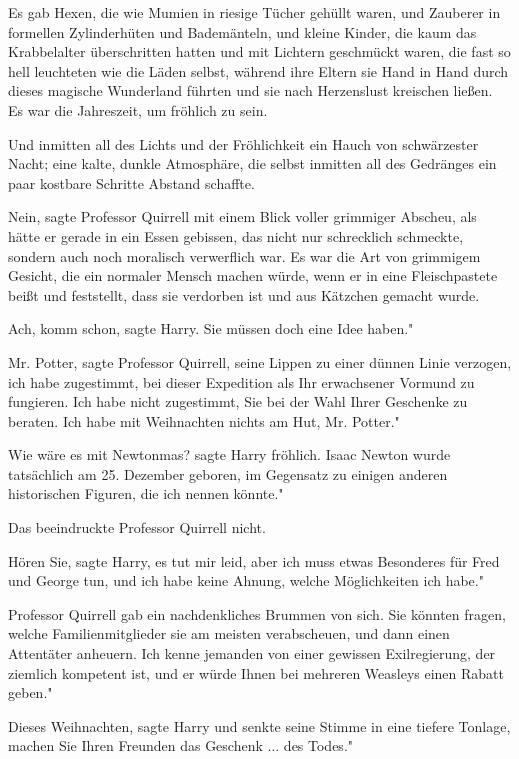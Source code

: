 Es gab Hexen, die wie Mumien in riesige Tücher gehüllt waren, und Zauberer in
formellen Zylinderhüten und Bademänteln, und kleine Kinder, die kaum das
Krabbelalter überschritten hatten und mit Lichtern geschmückt waren, die fast so
hell leuchteten wie die Läden selbst, während ihre Eltern sie Hand in Hand durch
dieses magische Wunderland führten und sie nach Herzenslust kreischen ließen. Es
war die Jahreszeit, um fröhlich zu sein.

Und inmitten all des Lichts und der Fröhlichkeit ein Hauch von schwärzester
Nacht; eine kalte, dunkle Atmosphäre, die selbst inmitten all des Gedränges ein
paar kostbare Schritte Abstand schaffte.

\glqq Nein\grqq{}, sagte Professor Quirrell mit einem Blick voller grimmiger
Abscheu, als hätte er gerade in ein Essen gebissen, das nicht nur schrecklich
schmeckte, sondern auch noch moralisch verwerflich war. Es war die Art von
grimmigem Gesicht, die ein normaler Mensch machen würde, wenn er in eine
Fleischpastete beißt und feststellt, dass sie verdorben ist und aus Kätzchen
gemacht wurde.

\glqq Ach, komm schon\grqq{}, sagte Harry. \glqq Sie müssen doch eine Idee
haben."

\glqq Mr. Potter\grqq{}, sagte Professor Quirrell, seine Lippen zu einer dünnen
Linie verzogen, \glqq ich habe zugestimmt, bei dieser Expedition als Ihr
erwachsener Vormund zu fungieren. Ich habe nicht zugestimmt, Sie bei der Wahl
Ihrer Geschenke zu beraten. Ich habe mit Weihnachten nichts am Hut, Mr. Potter."

\glqq Wie wäre es mit Newtonmas?\grqq{} sagte Harry fröhlich. \glqq Isaac Newton
wurde tatsächlich am 25. Dezember geboren, im Gegensatz zu einigen anderen
historischen Figuren, die ich nennen könnte."

Das beeindruckte Professor Quirrell nicht.

\glqq Hören Sie\grqq{}, sagte Harry, \glqq es tut mir leid, aber ich muss etwas
Besonderes für Fred und George tun, und ich habe keine Ahnung, welche
Möglichkeiten ich habe."

Professor Quirrell gab ein nachdenkliches Brummen von sich. \glqq Sie könnten
fragen, welche Familienmitglieder sie am meisten verabscheuen, und dann einen
Attentäter anheuern. Ich kenne jemanden von einer gewissen Exilregierung, der
ziemlich kompetent ist, und er würde Ihnen bei mehreren Weasleys einen Rabatt
geben."

\glqq Dieses Weihnachten\grqq{}, sagte Harry und senkte seine Stimme in eine
tiefere Tonlage, \glqq machen Sie Ihren Freunden das Geschenk ... des Todes."

